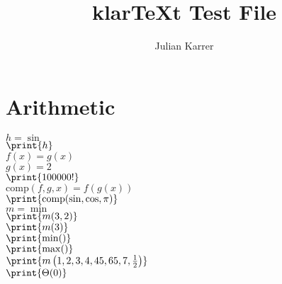 \documentclass[oneside, a4paper]{article}
\author{Julian Karrer}
\title{klarTeXt Test File}
\begin{document}
\maketitle
\section*{Arithmetic}

\begin{program}

$h = \sin$\\
$\print{h}$\\
$f(x) = g(x)$\\
$g(x) = 2$\\
$\print{100000!}$\\
$\text{comp}(f,g,x) = f(g(x))$\\
$\print{\text{comp}(\sin,\cos,\pi)}$\\
$m = \min$\\
$\print{m (3,2)}$\\
$\print{m (3)}$\\
$\print{\min ()}$\\
$\print{\max ()}$\\
$\print{m\left(1,2,3,4,45,65,7,\frac{1}{2}\right)}$\\
$\print{\Theta(0)}$\\


\end{program}
\end{document}
